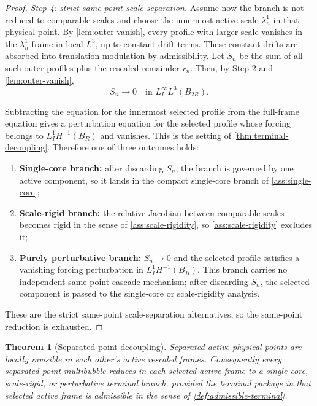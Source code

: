 \documentclass[11pt]{amsart}
\theoremstyle{plain}
\newtheorem{theorem}{Theorem}[section]
\theoremstyle{definition}
\theoremstyle{remark}
\begin{document}
\begin{proof}
\smallskip
\noindent\textit{Step 4: strict same-point scale separation.}
Assume now the branch is not reduced to comparable scales and choose the innermost
active scale \(\lambda^1_n\) in that physical point.  By
\cref{lem:outer-vanish}, every profile with larger scale vanishes in the
\(\lambda^1_n\)-frame in local \(L^3\), up to constant drift terms.
These constant drifts are absorbed into translation modulation by admissibility.
Let \(S_n\) be the sum of all such outer profiles plus the rescaled remainder
\(r_n\).  Then, by Step 2 and \cref{lem:outer-vanish},
\[
  S_n\to0\quad\text{in }L^\infty_I L^3(B_{2R}).
\]

Subtracting the equation for the innermost selected profile from the full-frame
equation gives a perturbation equation for the selected profile whose forcing
belongs to \(L^1_I H^{-1}(B_R)\) and vanishes.  This is the setting of
\cref{thm:terminal-decoupling}.  Therefore one of three outcomes holds:
\begin{enumerate}[label=\textup{(\alph*)}]
\item \textbf{Single-core branch:}
  after discarding \(S_n\), the branch is governed by one active component, so it
  lands in the compact single-core branch of \cref{ass:single-core};
\item \textbf{Scale-rigid branch:}
  the relative Jacobian between comparable scales becomes rigid in the sense of
  \cref{ass:scale-rigidity}, so \cref{ass:scale-rigidity} excludes it;
\item \textbf{Purely perturbative branch:}
  \(S_n\to0\) and the selected profile satisfies a vanishing forcing perturbation
  in \(L^1_IH^{-1}(B_R)\).  This branch carries no independent same-point
  cascade mechanism; after discarding \(S_n\), the selected component is passed
  to the single-core or scale-rigidity analysis.
\end{enumerate}

These are the strict same-point scale-separation alternatives, so the
same-point reduction is exhausted.
\end{proof}


\begin{theorem}[Separated-point decoupling]\label{thm:separated-point-reduction}
Separated active physical points are locally invisible in each other's active
rescaled frames.  Consequently every separated-point multibubble reduces in each
selected active frame to a single-core, scale-rigid, or perturbative terminal
branch, provided the terminal package in that selected active frame is
admissible in the sense of \cref{def:admissible-terminal}.
\end{theorem}
\end{document}
